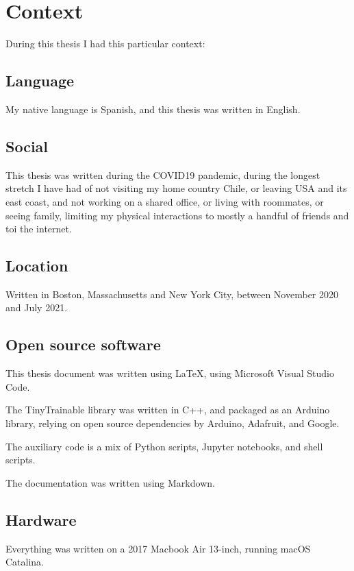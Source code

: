 \chapter{Context}

During this thesis I had this particular context:

\section{Language}

My native language is Spanish, and this thesis was written in English.

\section{Social}

This thesis was written during the COVID19 pandemic, during the longest stretch I have had of not visiting my home country Chile, or leaving USA and its east coast, and not working on a shared office, or living with roommates, or seeing family, limiting my physical interactions to mostly a handful of friends and toi the internet.

\section{Location}

Written in Boston, Massachusetts and New York City, between November 2020 and July 2021.

\section{Open source software}

This thesis document was written using LaTeX, using Microsoft Visual Studio Code.

The TinyTrainable library was written in C++, and packaged as an Arduino library, relying on open source dependencies by Arduino, Adafruit, and Google.

The auxiliary code is a mix of Python scripts, Jupyter notebooks, and shell scripts.

The documentation was written using Markdown.

\section{Hardware}

Everything was written on a 2017 Macbook Air 13-inch, running macOS Catalina.

\newpage
